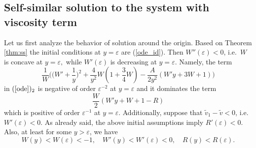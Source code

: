 \documentclass[reqno]{article}%
\theoremstyle{plain}
\theoremstyle{definition}
\theoremstyle{remark}
\numberwithin{equation}{section}
\begin{document}

\subsection{Self-similar solution to the system with viscosity term}

Let us first analyze the behavior of solution around the origin. Based on Theorem \ref{thm:ss} the initial conditions at $y=\varepsilon$ are (\ref{ode_id}).
Then $W''(\varepsilon)<0$, i.e.\ $W$ is concave at $y=\varepsilon,$ while $W'(\varepsilon)$ is decreasing at $y=\varepsilon$. Namely, the term
\[\frac{1}{W}\Big(\big(W'+\frac{1}{y}\big)^2+\frac{4}{y^2}W(1+\frac{3}{4}W)-\frac{A}{2y^2}(W'y+3W+1)\Big)\]
in $(\ref{ode})_2$ is negative of order $\varepsilon^{-2}$ at $y=\varepsilon$ and it dominates the term
\[\frac{W}{2}(W'y+W+1-R)\]
which is positive of order $\varepsilon^{-1}$ at $y=\varepsilon$. Additionally, suppose that $\tilde{v}_1-\tilde{v}<0$, i.e.\ $W'(\varepsilon)<0$. As already said, the above initial assumptions imply $R'(\varepsilon)<0.$
Also, at least for some $y>\varepsilon$, we have
\[W(y)<W(\varepsilon)<-1,\quad W'(y)<W'(\varepsilon)<0,\quad R(y)<R(\varepsilon).\]
\end{document}
